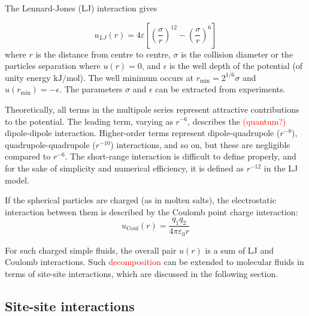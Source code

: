 The Lennard-Jones (LJ) interaction gives

\begin{equation}
u_{LJ}(r)=4\varepsilon\left[\left(\frac{\sigma}{r}\right)^{12}-\left(\frac{\sigma}{r}\right)^{6}\right]
\end{equation}
where $r$ is the distance from centre to centre, $\sigma$ is the
collision diameter or the particles separation where $u(r)=0$, and
$\epsilon$ is the well depth of the potential (of unity energy $\mathrm{kJ/mol}$).
The well minimum occurs at $r_{\min}=2^{1/6}\sigma$ and $u(r_{\min})=-\epsilon$.
The parameters $\sigma$ and $\epsilon$ can be extracted from experiments.

Theoretically, all terms in the multipole series represent attractive
contributions to the potential. The leading term, varying as $r^{-6}$,
describes the \textcolor{red}{(quantum?)} dipole-dipole interaction.
Higher-order terms represent dipole-quadrupole ($r^{-8}$), quadrupole-quadrupole
($r^{-10}$) interactions, and so on, but these are negligible compared
to $r^{-6}$. The short-range interaction is difficult to define properly,
and for the sake of simplicity and numerical efficiency, it is defined
as $r^{-12}$ in the LJ model. 

If the spherical particles are charged (as in molten salts), the electrostatic
interaction between them is described by the Coulomb point charge
interaction:
\begin{equation}
u_{\mathrm{Coul}}(r)=\frac{q_{1}q_{2}}{4\pi\varepsilon_{0}r}
\end{equation}

For such charged simple fluids, the overall pair $u(r)$ is a sum
of LJ and Coulomb interactions. Such \textcolor{red}{decomposition}
can be extended to molecular fluids in terms of site-site interactions,
which are discussed in the following section.

\subsection{Site-site interactions}

